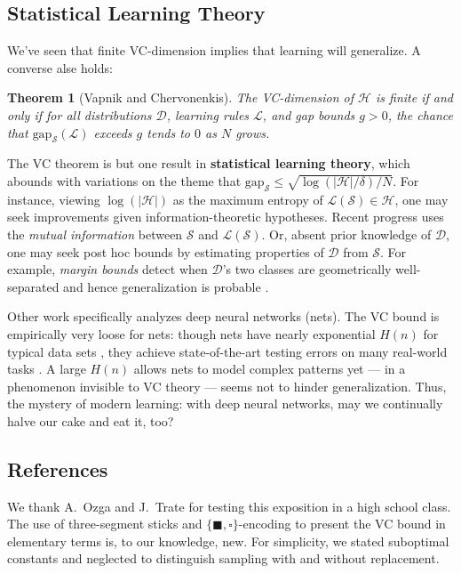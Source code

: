 \documentclass[twocolumn, 11pt]{article}
\newcommand{\Dd}{\mathcal{D}}
\newcommand{\Hh}{\mathcal{H}}
\newcommand{\Ll}{\mathcal{L}}
\newcommand{\Ss}{\mathcal{S}}
\newcommand{\Egap}{\text{gap}_{\Ss}}
\newtheorem*{thm}{Theorem}
\theoremstyle{definition}
\newcommand{\msec}[1]{\subsection*{\color{mblu}\textsf{#1}}}
\begin{document}
    \msec{Statistical Learning Theory}

        We've seen that finite VC-dimension implies that learning will
        generalize.  A converse alse holds:
        \begin{thm}[Vapnik and Chervonenkis]
            The VC-dimension of $\Hh$ is finite if and only if for all
            distributions $\Dd$, learning rules $\Ll$, and gap bounds $g>0$, the
            chance that $\Egap(\Ll)$ exceeds $g$ tends to $0$ as
            $N$ grows.  
        \end{thm}


        The VC theorem is but one result in \textbf{statistical
        learning theory}, which abounds with variations on
        the theme that $\Egap \leq \sqrt{\log(|\Hh|/\delta)/N}$.
        For instance, viewing $\log(|\Hh|)$ as the maximum entropy of
        $\Ll(\Ss) \in \Hh$, one may seek improvements given
        information-theoretic hypotheses.  Recent progress
        \cite{abbe} uses the \emph{mutual information} between $\Ss$ and
        $\Ll(\Ss)$.
        Or, absent prior knowledge of $\Dd$, one may seek post hoc bounds by
        estimating properties of $\Dd$ from $\Ss$.  For example, \emph{margin
        bounds} detect when $\Dd$'s two classes are geometrically
        well-separated and hence generalization is probable \cite{mohri}.


        Other work specifically analyzes deep neural networks (nets).  The VC
        bound is
        empirically very
        loose for nets: though nets
        have nearly exponential $H(n)$ for typical data sets
        \cite{bengio}, they achieve state-of-the-art testing errors
        on many real-world tasks \cite{hinton}.
        A large $H(n)$
        allows nets to model complex patterns yet --- in a phenomenon invisible
        to VC theory --- seems not to hinder generalization.
        Thus, the mystery of modern learning: with deep neural
        networks, may we continually halve our cake and eat it, too?

    \msec{References}
        We thank A.\ Ozga and J.\ Trate for testing this
        exposition in a high school class.
        The use of three-segment sticks and $\{\blacksquare,
        \square\}$-encoding to present the VC bound in elementary terms is, to
        our knowledge, new.
        For simplicity, we stated suboptimal constants and neglected to
        distinguish sampling with and without replacement.
\end{document}
